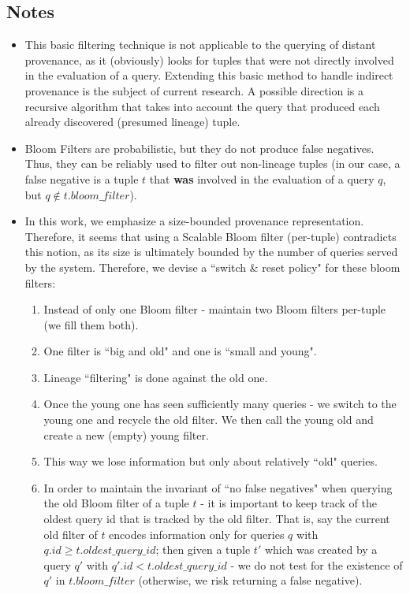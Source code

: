 \subsection{Notes} 
\begin{itemize}
    \item This basic filtering technique is not applicable to the querying of distant provenance, as it (obviously) looks for tuples that were not directly involved in the evaluation of a query. Extending this basic method to handle indirect provenance is the subject of current research. A possible direction is a recursive algorithm that takes into account the query that produced each already discovered (presumed lineage) tuple.
    \item Bloom Filters are probabilistic, but they do not produce false negatives. Thus, they can be reliably used to filter out non-lineage tuples (in our case, a false negative is a tuple $t$ that \textbf{was} involved in the evaluation of a query $q$, but $q \notin t.bloom\_filter$). 
    \item In this work, we emphasize a size-bounded provenance representation. Therefore, it seems that using a Scalable Bloom filter (per-tuple) contradicts this notion, as its size is ultimately bounded by the number of queries served by the system. Therefore, we devise a ``switch \& reset policy" for these bloom filters:
    \begin{enumerate}
        \item Instead of only one Bloom filter - maintain two Bloom filters per-tuple (we fill them both).
        \item One filter is ``big and old" and one is ``small and young".
        \item Lineage ``filtering" is done against the old one.
        \item Once the young one has seen sufficiently many queries - we switch to the young one and recycle the old filter. We then call the young old and create a new (empty) young filter.
        \item This way we lose information but only about relatively ``old" queries.
        \item In order to maintain the invariant of ``no false negatives" when querying the old Bloom filter of a tuple $t$ - it is important to keep track of the oldest query id that is tracked by the old filter. That is, say the current old filter of $t$ encodes information only for queries $q$ with $q.id \geq t.oldest\_query\_id$\footnotemark; then given a tuple $t'$ which was created by a query $q'$ with $q'.id < t.oldest\_query\_id$ - we do not test for the existence of $q'$ in $t.bloom\_filter$ (otherwise, we risk returning a false negative).
    \end{enumerate}
\end{itemize}


